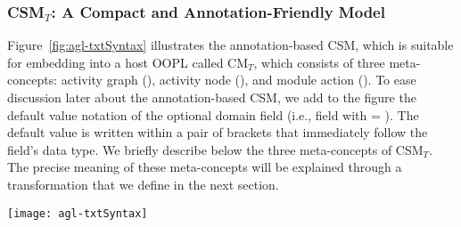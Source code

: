 \subsubsection*{CSM$_T$: A Compact and Annotation-Friendly Model}
%
Figure~\ref{fig:agl-txtSyntax} illustrates the annotation-based CSM, which is suitable for embedding into a host OOPL called CM$_T$, which consists of three meta-concepts: activity graph (), activity node (), and module action (). To ease discussion later about the annotation-based CSM, we add to the figure the default value notation of the optional domain field (i.e., field with  = ). The default value is written within a pair of brackets that immediately follow the field's data type.
%
We briefly describe below the three meta-concepts of CSM$_T$. The precise meaning of these meta-concepts will be explained through a transformation that we define in the next section. 

\begin{figure*}[ht]
	\begin{center}
		\texttt{[image: agl-txtSyntax]}
	\end{center}
\vspace{-0.4cm}
	\caption{Illustration for AGL's annotation-based textual concrete syntax, realized in Java.} %
	\label{fig:agl-txtSyntax}
	\vspace{-0.3cm}
\end{figure*}

